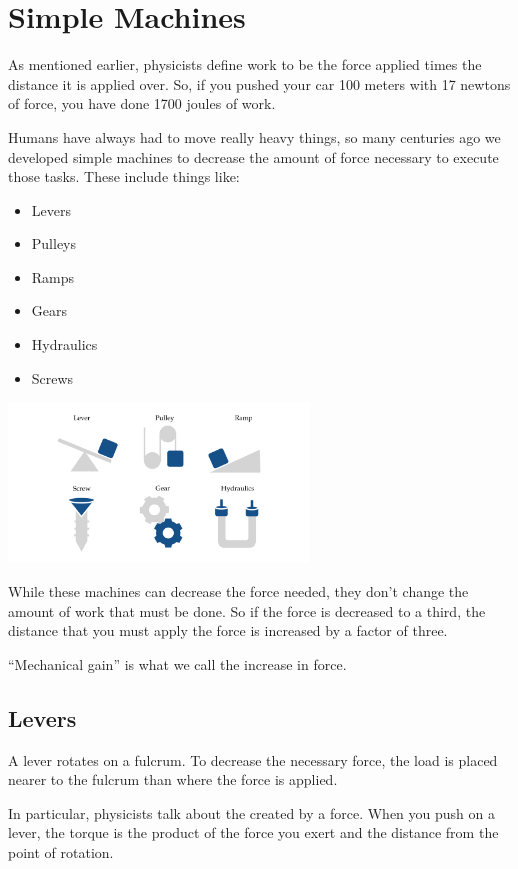 \chapter{Simple Machines}

As mentioned earlier, physicists define work to be the force applied
times the distance it is applied over. So, if you pushed your car 100
meters with 17 newtons of force, you have done 1700 joules of work.

Humans have always had to move really heavy things, so many centuries
ago we developed simple machines to decrease the amount of force
necessary to execute those tasks. These include things like:
\begin{itemize}
\item Levers
\item Pulleys
\item Ramps
\item Gears
\item Hydraulics
\item Screws
\end{itemize}

\includegraphics[width=0.6\textwidth]{simplemachines.png}

While these machines can decrease the force needed, they don't change
the amount of work that must be done. So if the force is decreased to
a third, the distance that you must apply the force is increased by a
factor of three.

``Mechanical gain'' is what we call the increase in force.

\section{Levers}

A lever rotates on a fulcrum. To decrease the necessary force, the load
is placed nearer to the fulcrum than where the force is applied.

In particular, physicists talk about the  created by a
force. When you push on a lever, the torque is the product of the
force you exert and the distance from the point of rotation.

